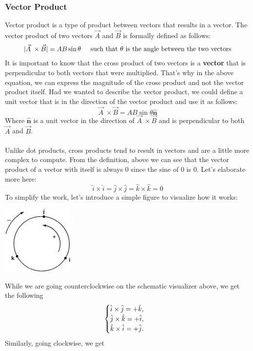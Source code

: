 \documentclass[9pt]{exam}
\begin{document}
\subsubsection*{Vector Product}
Vector product is a type of product between vectors that results in a vector. The vector product of two vectors $\vec{A}$ and $\vec{B}$ is formally defined as follows:
$$|\vec{A}\; \times \vec{B}| = AB \sin \theta\hspace{0.2in}\text{such that }\theta\text{ is the angle between the two vectors}$$
It is important to know that the cross product of two vectors is a \textbf{vector} that is perpendicular to both vectors that were multiplied. That's why in the above equation, we can express the magnitude of the cross product and not the vector product itself. Had we wanted to describe the vector product, we could define a unit vector that is in the direction of the vector product and use it as follows:
$$\vec{A}\; \times \vec{B}= AB\sin\theta\hat{\textbf{n}}$$
Where $\hat{\textbf{n}}$ is a unit vector in the direction of $\vec{A}\; \times \vec{B}$ and is perpendicular to both $\vec{A}$ and $\vec{B}$. \\ \\
Unlike dot products, cross products tend to result in vectors and are a little more complex to compute. From the definition, above we can see that the vector product of a vector with itself is always 0 since the sine of 0 is 0. Let's elaborate more here:
$$\hat{i} \times \hat{i} = \hat{j} \times \hat{j} = \hat{k} \times \hat{k} = 0 $$
To simplify the work, let's introduce a simple figure to visualize how it works:
\begin{center}
	\includegraphics[scale=1.2]{cross_product_circle}
\end{center}
While we are going counterclockwise on the schematic visualizer above, we get the following
$$\begin{cases} \hat{i} \times \hat{j} = + \hat{k}, \\ \hat{j} \times \hat{k} = + \hat{i}, \\ \hat{k} \times \hat{i} = + \hat{j} \ldotp \end{cases}$$
Similarly, going clockwise, we get
\end{document}
